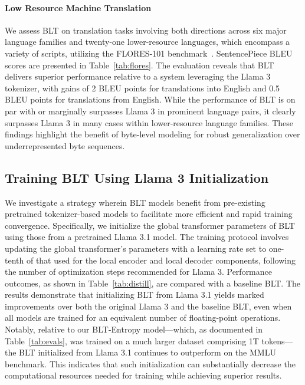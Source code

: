 \paragraph{Low Resource Machine Translation} We assess {\textsc BLT} on translation tasks involving both directions across six major language families and twenty-one lower-resource languages, which encompass a variety of scripts, utilizing the FLORES-101 benchmark~\citep{goyal2022flores}. SentencePiece BLEU scores are presented in Table~\ref{tab:flores}. The evaluation reveals that {\textsc BLT} delivers superior performance relative to a system leveraging the Llama 3 tokenizer, with gains of 2 BLEU points for translations into English and 0.5 BLEU points for translations from English. While the performance of {\textsc BLT} is on par with or marginally surpasses Llama 3 in prominent language pairs, it clearly surpasses Llama 3 in many cases within lower-resource language families. These findings highlight the benefit of byte-level modeling for robust generalization over underrepresented byte sequences.

\subsection{Training {\textsc BLT} Using Llama 3 Initialization}
\label{sec:distillation}
We investigate a strategy wherein {\textsc BLT} models benefit from pre-existing pretrained tokenizer-based models to facilitate more efficient and rapid training convergence. Specifically, we initialize the global transformer parameters of {\textsc BLT} using those from a pretrained Llama 3.1 model. The training protocol involves updating the global transformer’s parameters with a learning rate set to one-tenth of that used for the local encoder and local decoder components, following the number of optimization steps recommended for Llama 3. Performance outcomes, as shown in Table~\ref{tab:distill}, are compared with a baseline {\textsc BLT}. The results demonstrate that initializing {\textsc BLT} from Llama 3.1 yields marked improvements over both the original Llama 3 and the baseline {\textsc BLT}, even when all models are trained for an equivalent number of floating-point operations. Notably, relative to our {\textsc BLT}-Entropy model—which, as documented in Table~\ref{tab:evals}, was trained on a much larger dataset comprising 1T tokens—the {\textsc BLT} initialized from Llama 3.1 continues to outperform on the MMLU benchmark. This indicates that such initialization can substantially decrease the computational resources needed for training while achieving superior results.


